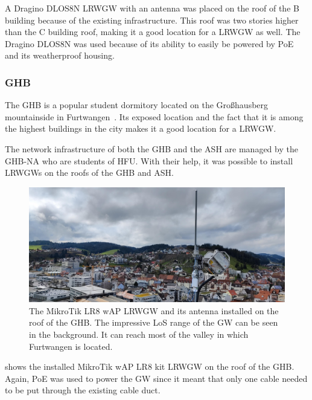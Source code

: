 A Dragino DLOS8N \acl{LRWGW} with an antenna was placed on the roof of the B building because of the existing infrastructure.
This roof was two stories higher than the C building roof, making it a good location for a \acl{LRWGW} as well.
The Dragino DLOS8N was used because of its ability to easily be powered by \ac{PoE} and its weatherproof housing.

\subsubsection{\acl{GHB}}

The \ac{GHB} is a popular student dormitory located on the Großhausberg mountainside in Furtwangen~\cite{ghb_netadmins_student_2023}.
Its exposed location and the fact that it is among the highest buildings in the city makes it a good location for a \acl{LRWGW}.

The network infrastructure of both the \ac{GHB} and the \ac{ASH} are managed by the \acl{GHB-NA} who are students of \ac{HFU}.
With their help, it was possible to install \aclp{LRWGW} on the roofs of the \ac{GHB} and \ac{ASH}.

\begin{figure}[htbp]
    \centering
    \includegraphics[width=1\textwidth]{pictures/hardware/gateway-deployment/lr8_ghb_installation.jpg}
    \caption{
        The MikroTik LR8 wAP \acl{LRWGW} and its antenna installed on the roof of the \ac{GHB}.
        The impressive \ac{LoS} range of the \acl{GW} can be seen in the background.
        It can reach most of the valley in which Furtwangen is located.
    }\label{pic:mikrotik-gateway-ghb-installation}
\end{figure}

 shows the installed MikroTik wAP LR8 kit \acl{LRWGW} on the roof of the \ac{GHB}.
Again, \ac{PoE} was used to power the \acl{GW} since it meant that only one cable needed to be put through the existing cable duct.

